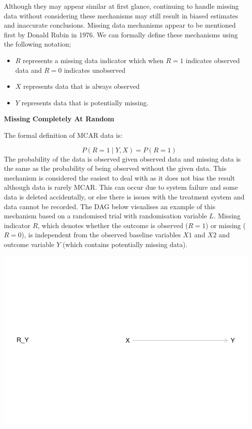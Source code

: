 \documentclass{article}
\providecommand{\tightlist}{%
  \setlength{\itemsep}{0pt}\setlength{\parskip}{0pt}}
\newcommand{\pandocbounded}[1]{#1}
\begin{document}
Although they may appear similar at first glance, continuing to handle
missing data without considering these mechanisms may still result in
biased estimates and inaccurate conclusions. Missing data mechanisms
appear to be mentioned first by Donald Rubin in 1976. We can formally
define these mechanisms using the following notation;

\begin{itemize}
\tightlist
\item
  \(R\) represents a missing data indicator which when \(R=1\) indicates
  observed data and \(R=0\) indicates unobserved
\item
  \(X\) represents data that is always observed
\item
  \(Y\) represents data that is potentially missing.
\end{itemize}

\textbf{Missing Completely At Random}

The formal definition of MCAR data is:

\[\quad P(R = 1 \mid Y, X) = P(R = 1)\] The probability of the data is
observed given observed data and missing data is the same as the
probability of being observed without the given data. This mechanism is
considered the easiest to deal with as it does not bias the result
although data is rarely MCAR. This can occur due to system failure and
some data is deleted accidentally, or else there is issues with the
treatment system and data cannot be recorded. The DAG below visualises
an example of this mechanism based on a randomised trial with
randomisation variable \(L\). Missing indicator \(R\), which denotes
whether the outcome is observed (\(R = 1\)) or missing (\(R = 0\)), is
independent from the observed baseline variables \(X1\) and \(X2\) and
outcome variable \(Y\) (which contains potentially missing data).

\pandocbounded{\includegraphics[keepaspectratio]{Final_Report_files/figure-latex/unnamed-chunk-1-1.pdf}}
\end{document}
